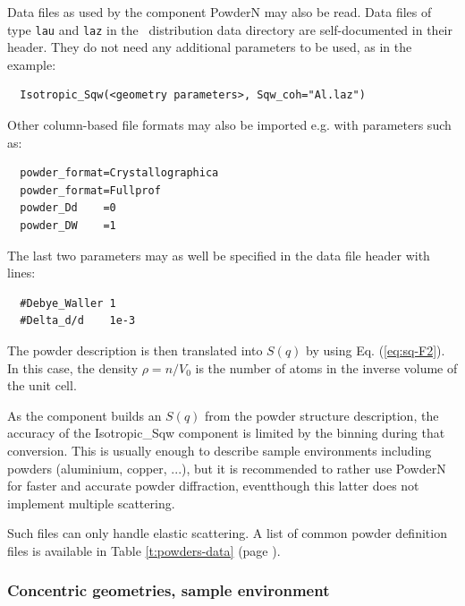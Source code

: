 Data files as used by the component PowderN may also be read. Data files of type \verb'lau' and \verb'laz' in the \MCS\ distribution data directory are self-documented in their header. They do not need any additional parameters to be used, as in the example:
\begin{verbatim}
  Isotropic_Sqw(<geometry parameters>, Sqw_coh="Al.laz")
\end{verbatim}
Other column-based file formats may also be imported e.g. with parameters such as:
\begin{verbatim}
  powder_format=Crystallographica
  powder_format=Fullprof
  powder_Dd    =0
  powder_DW    =1
\end{verbatim}
The last two parameters may as well be specified in the data file header with lines:
\begin{verbatim}
  #Debye_Waller 1
  #Delta_d/d    1e-3
\end{verbatim}
The powder description is then translated into $S(q)$ by using Eq. (\ref{eq:sq-F2}).
In this case, the density $\rho = n/V_0$ is the number of atoms in the inverse volume of the unit cell.

As the component builds an $S(q)$ from the powder structure description, the accuracy of the Isotropic\_Sqw component is limited by the binning during that conversion. This is usually enough to describe sample environments including powders (aluminium, copper, ...), but it is recommended to rather use PowderN for faster and accurate powder diffraction, eventthough this latter does not implement multiple scattering.

Such files can only handle elastic scattering. A list of common powder definition files is available in Table \ref{t:powders-data} (page \pageref{t:powders-data}).

\subsubsection{Concentric geometries, sample environment}

